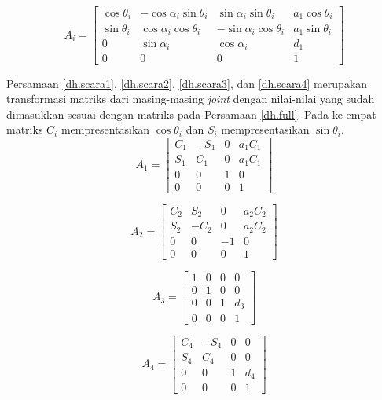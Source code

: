 \begin{equation}
A_{i} = \begin{bmatrix}
\cos\theta_{i} &  -\cos\alpha_{i}\sin\theta_{i}&  \sin\alpha_{i}\sin\theta_{i}& a_{1}\cos\theta_{i}\\ 
\sin\theta_{i}&  \cos\alpha_{i}\cos\theta_{i}&  -\sin\alpha_{i}\cos\theta_{i}& a_{1}\sin\theta_{i}\\ 
0&\sin\alpha_{i}  &\cos\alpha_{i}  &d_{1} \\ 
0 & 0 & 0 &1 
\end{bmatrix}
\label{dh.full}
\end{equation}

 Persamaan \ref{dh.scara1}, \ref{dh.scara2}, \ref{dh.scara3}, dan \ref{dh.scara4} merupakan transformasi matriks dari masing-masing \textit{joint} dengan nilai-nilai yang sudah dimasukkan sesuai dengan matriks pada Persamaan \ref{dh.full}. Pada ke empat matriks $C_{i}$ mempresentasikan $\cos\theta_{i}$ dan $S_{i}$ mempresentasikan $\sin\theta_{i}$.
\begin{equation}
A_{1} = \begin{bmatrix}
C_{1} &  -S_{1}&  0& a_{1}C_{1}\\ 
S_{1}&  C_{1}&  0& a_{1}C_{1}\\ 
0&0  &1  &0 \\ 
0 & 0 & 0 &1 
\end{bmatrix}
\label{dh.scara1}
\end{equation}

\begin{equation}
A_{2} = \begin{bmatrix}
C_{2} &  S_{2}&  0& a_{2}C_{2}\\ 
S_{2}&  -C_{2}&  0& a_{2}C_{2}\\ 
0&0  &-1  &0 \\ 
0 & 0 & 0 &1 
\end{bmatrix}
\label{dh.scara2}
\end{equation}


\begin{equation}A_{3}=\begin{bmatrix}
1 & 0 &0  &0 \\ 
0&1  &0  &0 \\ 
0 &0  &1  &d_{3} \\ 
0&0  &0  &1 
\end{bmatrix} 
\label{dh.scara3}
\end{equation}

\begin{equation}
A_{4} = \begin{bmatrix}
C_{4} &  -S_{4}&  0& 0\\ 
S_{4}&  C_{4}&  0& 0\\ 
0&0  &1  &d_{4} \\ 
0 & 0 & 0 &1 
\end{bmatrix}
\label{dh.scara4}
\end{equation}

